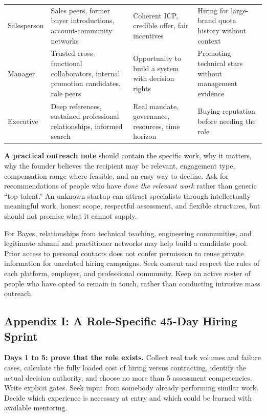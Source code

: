 \begin{table}[t]
\begin{tabularx}{\textwidth}{p{2.5cm} p{4.6cm} p{4.2cm} p{4.2cm}}
Salesperson & Sales peers, former buyer introductions, account-community networks & Coherent ICP, credible offer, fair incentives & Hiring for large-brand quota history without context \\
Manager & Trusted cross-functional collaborators, internal promotion candidates, role peers & Opportunity to build a system with decision rights & Promoting technical stars without management evidence \\
Executive & Deep references, sustained professional relationships, informed search & Real mandate, governance, resources, time horizon & Buying reputation before needing the role \\
\bottomrule
\end{tabularx}
\end{table}

\textbf{A practical outreach note} should contain the specific work, why it matters, why the founder believes the recipient may be relevant, engagement type, compensation range where feasible, and an easy way to decline. Ask for recommendations of people who have \textit{done the relevant work} rather than generic ``top talent.'' An unknown startup can attract specialists through intellectually meaningful work, honest scope, respectful assessment, and flexible structures, but should not promise what it cannot supply.

For Bayes, relationships from technical teaching, engineering communities, and legitimate alumni and practitioner networks may help build a candidate pool. Prior access to personal contacts does not confer permission to reuse private information for unrelated hiring campaigns. Seek consent and respect the rules of each platform, employer, and professional community. Keep an active roster of people who have opted to remain in touch, rather than conducting intrusive mass outreach.

\subsection*{Appendix I: A Role-Specific 45-Day Hiring Sprint}

\textbf{Days 1 to 5: prove that the role exists.} Collect real task volumes and failure cases, calculate the fully loaded cost of hiring versus contracting, identify the actual decision authority, and choose no more than 5 assessment competencies. Write explicit gates. Seek input from somebody already performing similar work. Decide which experience is necessary at entry and which could be learned with available mentoring.

